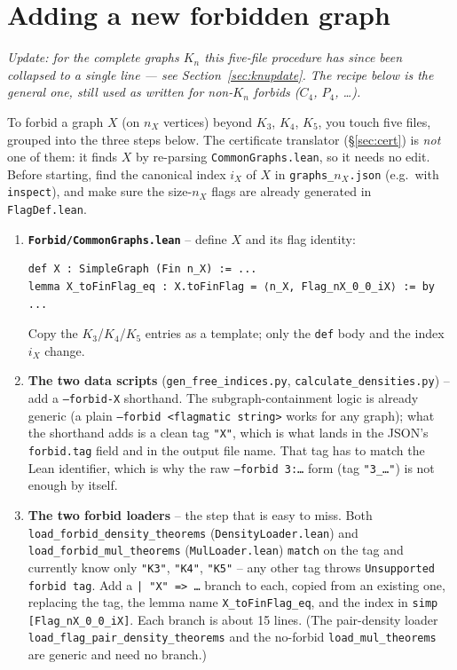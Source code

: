 \documentclass[11pt]{article}
\begin{document}
\section{Adding a new forbidden graph}
\label{sec:newforbid}

\emph{Update: for the complete graphs $K_n$ this five-file procedure has since
been collapsed to a single line --- see Section~\ref{sec:knupdate}. The recipe
below is the general one, still used as written for non-$K_n$ forbids
($C_4$, $P_4$, \ldots).}

To forbid a graph $X$ (on $n_X$ vertices) beyond $K_3$, $K_4$, $K_5$, you
touch five files, grouped into the three steps below. The certificate
translator (\S\ref{sec:cert}) is \emph{not} one of them: it finds $X$ by
re-parsing \texttt{CommonGraphs.lean}, so it needs no edit. Before
starting, find the canonical index $i_X$ of $X$ in
\texttt{graphs\_$n_X$.json} (e.g.\ with \texttt{inspect}), and make sure
the size-$n_X$ flags are already generated in \texttt{FlagDef.lean}.

\begin{enumerate}
\item \textbf{\texttt{Forbid/CommonGraphs.lean}} -- define $X$ and its flag
  identity:
\begin{lstlisting}
def X : SimpleGraph (Fin n_X) := ...
lemma X_toFinFlag_eq : X.toFinFlag = ⟨n_X, Flag_nX_0_0_iX⟩ := by ...
\end{lstlisting}
  Copy the $K_3$/$K_4$/$K_5$ entries as a template; only the \texttt{def}
  body and the index $i_X$ change.

\item \textbf{The two data scripts} (\texttt{gen\_free\_indices.py},
  \texttt{calculate\_densities.py}) -- add a \texttt{--forbid-X} shorthand.
  The subgraph-containment logic is already generic (a plain
  \texttt{--forbid <flagmatic string>} works for any graph); what the
  shorthand adds is a clean tag \texttt{"X"}, which is what lands in the
  JSON's \texttt{forbid.tag} field and in the output file name. That tag
  has to match the Lean identifier, which is why the raw \texttt{--forbid
  3:\ldots} form (tag \texttt{"3\_\ldots"}) is not enough by itself.

\item \textbf{The two forbid loaders} -- the step that is easy to miss.
  Both \texttt{load\_forbid\_density\_theorems}
  (\texttt{DensityLoader.lean}) and \texttt{load\_forbid\_mul\_theorems}
  (\texttt{MulLoader.lean}) \texttt{match} on the tag and currently know
  only \texttt{"K3"}, \texttt{"K4"}, \texttt{"K5"} -- any other tag throws
  \texttt{Unsupported forbid tag}. Add a \texttt{| "X" => \ldots} branch to
  each, copied from an existing one, replacing the tag, the lemma name
  \texttt{X\_toFinFlag\_eq}, and the index in
  \texttt{simp [Flag\_nX\_0\_0\_iX]}. Each branch is about 15 lines. (The
  pair-density loader \texttt{load\_flag\_pair\_density\_theorems} and the
  no-forbid \texttt{load\_mul\_theorems} are generic and need no branch.)
\end{enumerate}
\end{document}
